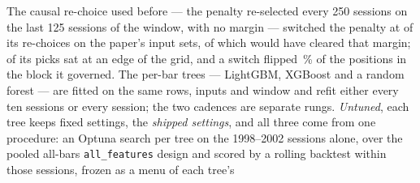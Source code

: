 The causal re-choice used before --- the penalty re-selected every 250 sessions on the %
last 125 sessions of the window, with no margin --- switched the penalty at
\cmPtCausalSwitchesPaper{} of its \cmPtCausalChoicesPaper{} re-choices on the paper's input
sets, of which \cmPtCausalMarginPassPaper{} would have cleared that margin;
\cmPtCausalEdgePicksPaper{} of its \cmPtCausalPicksPaper{} picks sat at an edge of the grid, and
a switch flipped \cmPtSwitchFlipPctPaper\,\% of the positions in the block it governed. The per-bar
trees --- LightGBM, XGBoost and a random forest --- are fitted on the same rows,
inputs and window and refit either every ten sessions or every session; the two
cadences are separate rungs. \emph{Untuned}, each tree keeps fixed settings, the %
\emph{shipped settings}, and all three come from one procedure: an Optuna search per tree
on the 1998--2002 sessions alone, over the pooled all-bars \texttt{all\_features} design
and scored by a rolling backtest within those sessions, frozen as a menu of each tree's
